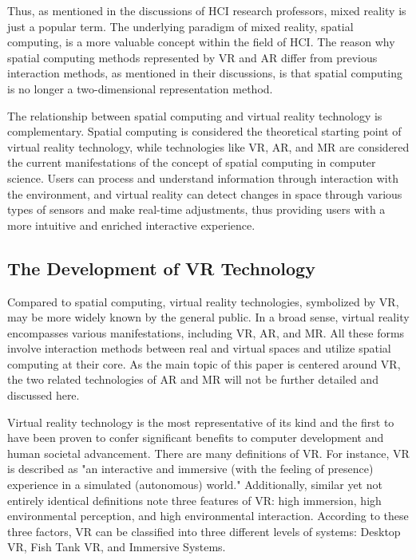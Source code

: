Thus, as mentioned in the discussions of HCI research professors, mixed reality is just a popular term. The underlying paradigm of mixed reality, spatial computing, is a more valuable concept within the field of HCI. The reason why spatial computing methods represented by VR and AR differ from previous interaction methods, as mentioned in their discussions, is that spatial computing is no longer a two-dimensional representation method.

The relationship between spatial computing and virtual reality technology is complementary. Spatial computing is considered the theoretical starting point of virtual reality technology, while technologies like VR, AR, and MR are considered the current manifestations of the concept of spatial computing in computer science. Users can process and understand information through interaction with the environment, and virtual reality can detect changes in space through various types of sensors and make real-time adjustments, thus providing users with a more intuitive and enriched interactive experience.

\subsection{The Development of VR Technology}
Compared to spatial computing, virtual reality technologies, symbolized by VR, may be more widely known by the general public. In a broad sense, virtual reality encompasses various manifestations, including VR, AR, and MR. All these forms involve interaction methods between real and virtual spaces and utilize spatial computing at their core. As the main topic of this paper is centered around VR, the two related technologies of AR and MR will not be further detailed and discussed here.

Virtual reality technology is the most representative of its kind and the first to have been proven to confer significant benefits to computer development and human societal advancement. There are many definitions of VR. For instance, VR is described as "an interactive and immersive (with the feeling of presence) experience in a simulated (autonomous) world."\cite{paper14} Additionally, similar yet not entirely identical definitions note three features of VR: high immersion, high environmental perception, and high environmental interaction\cite{paper15}. According to these three factors, VR can be classified into three different levels of systems: Desktop VR, Fish Tank VR, and Immersive Systems.

